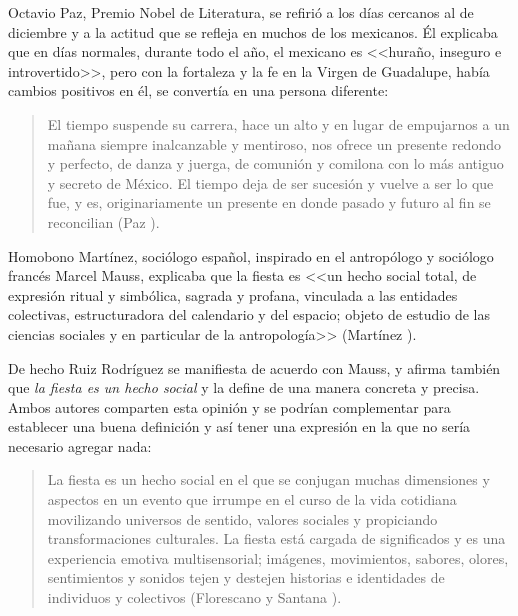 \documentclass[14pt,letterpaper,twoside]{extbook} %
\begin{document}
Octavio Paz, Premio Nobel de Literatura, se refirió a los días cercanos al  de diciembre y a la actitud que se refleja en muchos de los mexicanos. Él explicaba que en días normales, durante todo el año, el mexicano es <<huraño, inseguro e introvertido>>, pero con la fortaleza y la fe en la Virgen de Guadalupe, había cambios positivos en él, se convertía en una persona diferente:

\begin{quotation}
\noindent El tiempo suspende su carrera, hace un alto y en lugar de empujarnos a un mañana siempre inalcanzable y mentiroso, nos ofrece un presente redondo y perfecto, de danza y juerga, de comunión y comilona con lo más antiguo y secreto de México. El tiempo deja de ser sucesión y vuelve a ser lo que fue, y es, originariamente un presente en donde pasado y futuro al fin se reconcilian (Paz ).
\end{quotation}

\noindent Homobono Martínez, sociólogo español, inspirado en el antropólogo y sociólogo francés Marcel Mauss, explicaba que la fiesta es <<un hecho social total, de expresión ritual y simbólica, sagrada y profana, vinculada a las entidades colectivas, estructuradora del calendario y del espacio; objeto de estudio de las ciencias sociales y en particular de la antropología>> (Martínez ).

De hecho Ruiz Rodríguez se manifiesta de acuerdo con Mauss, y afirma también que \textit{la fiesta es un hecho social} y la define de una manera concreta y precisa. Ambos autores comparten esta opinión y se podrían complementar para establecer una buena definición y así tener una expresión en la que no sería necesario agregar nada:

\begin{quotation}
\noindent La fiesta es un hecho social en el que se conjugan muchas dimensiones y aspectos en un evento que irrumpe en el curso de la vida cotidiana movilizando universos de sentido, valores sociales y propiciando transformaciones culturales. La fiesta está cargada de significados y es una experiencia emotiva multisensorial; imágenes, movimientos, sabores, olores, sentimientos y sonidos tejen y destejen historias e identidades de individuos y colectivos (Florescano y Santana ).
\end{quotation}
\end{document}
